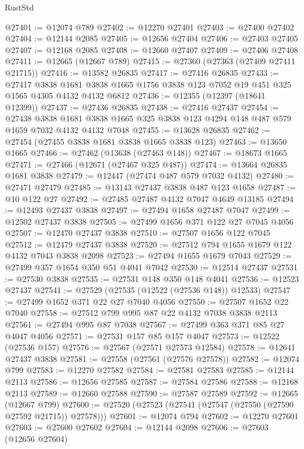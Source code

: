 \begin{lexlean}{RustStd}
\begin{coremodule}
@27401 := @12074 @789
@27402 := @12270 @27401
@27403 := @27400 @27402
@27404 := @12144 @2085
@27405 := @12656 @27404
@27406 := @27403 @27405
@27407 := @12168 @2085
@27408 := @12660 @27407
@27409 := @27406 @27408
@27411 := @12665 (@12667 @789)
@27415 := @27360 (@27363 (@27409 @27411 @21715))
@27416 := @13582 @26835
@27417 := @27416 @26835
@27433 := @27417
    @3838
    @1681
    @3838
    @1665
    @1756
    @3838
    @123
    @7052
    @19
    @451
    @325
    @1565
    @4305
    @4132
    @4132
    @6812
@27436 := @12355 (@12397 (@18641 @12399))
@27437 := @27436 @26835
@27438 := @27416 @27437
@27454 := @27438
    @3838
    @1681
    @3838
    @1665
    @325
    @3838
    @123
    @4294
    @148
    @487
    @579
    @1659
    @7032
    @4132
    @4132
    @7048
@27455 := @13628 @26835
@27462 := @27454 (@27455 @3838 @1681 @3838 @1665 @3838 @123)
@27463 := @13650 @1665
@27466 := @27462 (@13638 (@27463 @148))
@27467 := @18673 @1665
@27471 := @27466 (@12671 (@27467 @325 @487))
@27474 := @13664 @26835 @1681 @3838
@27479 := @12447 (@27474 @487 @579 @7032 @4132)
@27480 := @27471 @27479
@27485 := @13143 @27437 @3838 @487 @123 @1658
@27487 := @10 @122 @27
@27492 := @27485 @27487 @4132 @7047 @4649 @13185
@27494 := @12493 @27437 @3838
@27497 := @27494 @1658 @27487 @7047
@27499 := @12502 @27437 @3838
@27505 := @27499 @1656 @371 @122 @27 @7045 @4056
@27507 := @12470 @27437 @3838
@27510 := @27507 @1656 @122 @7045
@27512 := @12479 @27437 @3838
@27520 := @27512 @794 @1655 @1679 @122 @4132 @7043 @3838 @2098
@27523 := @27494 @1655 @1679 @7043
@27529 := @27499 @357 @1654 @350 @51 @4041 @7042
@27530 := @12514 @27437
@27531 := @27530 @3838
@27535 := @27531 @148 @350 @148 @4041
@27536 := @12523 @27437
@27541 := @27529 (@27535 (@12522 (@27536 @148)) @12533)
@27547 := @27499 @1652 @371 @22 @27 @7040 @4056
@27550 := @27507 @1652 @22 @7040
@27558 := @27512 @799 @995 @87 @22 @4132 @7038 @3838 @2113
@27561 := @27494 @995 @87 @7038
@27567 := @27499 @363 @371 @85 @27 @4047 @4056
@27571 := @27531 @157 @85 @157 @4047
@27573 := @12522 (@27536 @157)
@27576 := @27567 (@27571 @27573 @12584)
@27578 := @12641 @27437 @3838
@27581 := @27558 (@27561 (@27576 @27578))
@27582 := @12074 @799
@27583 := @12270 @27582
@27584 := @27581 @27583
@27585 := @12144 @2113
@27586 := @12656 @27585
@27587 := @27584 @27586
@27588 := @12168 @2113
@27589 := @12660 @27588
@27590 := @27587 @27589
@27592 := @12665 (@12667 @799)
@27600 := @27520 (@27523 (@27541 (@27547 (@27550 (@27590 @27592 @21715)) @27578)))
@27601 := @12074 @794
@27602 := @12270 @27601
@27603 := @27600 @27602
@27604 := @12144 @2098
@27606 := @27603 (@12656 @27604)

\end{coremodule}
\end{lexlean}
